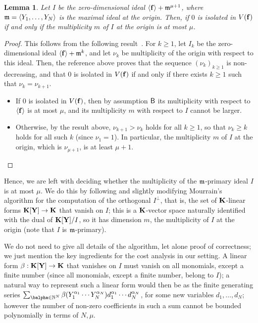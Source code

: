 \documentclass[12pt]{article}
\newtheorem{lemma}[definition]{Lemma}
\begin{document}
\begin{lemma}
  Let $I$ be the zero-dimensional ideal $\langle \mathbf{f} \rangle +
  \mathfrak{m}^{\mu+1}$, where $\mathfrak{m}=\langle Y_1,\dots,Y_N\rangle$ is the maximal
  ideal at the origin. Then, if $0$ is isolated in $V(\mathbf{f})$ if and only
  if the multiplicity $m$ of $I$ at the origin is at most $\mu$.
\end{lemma}
\begin{proof}
  This follows from the following
  result~\cite[Theorem~A.1]{BaHaPeSo09}.  For $k \ge 1$, let $I_k$ be
  the zero-dimensional ideal $\langle \mathbf{f} \rangle + \mathfrak{m}^{k}$, and let
  $\nu_k$ be multiplicity of the origin with respect to this
  ideal. Then, the reference above proves that the sequence
  $(\nu_k)_{k \ge 1}$ is non-decreasing, and that $0$ is isolated in
  $V(\mathbf{f})$ if and only if there exists $k\ge 1$ such that
  $\nu_k=\nu_{k+1}$.
  \begin{itemize}
  \item If $0$ is isolated in $V(\mathbf{f})$, then by assumption $\sf B$ 
    its multiplicity with respect to $\langle \mathbf{f}\rangle$ is at most $\mu$,
    and its multiplicity $m$ with respect to $I$ cannot be larger.
  \item Otherwise, by the result above, $\nu_{k+1} > \nu_k$ holds for
    all $k \ge 1$, so that $\nu_k \ge k$ holds for all such $k$ (since
    $\nu_1=1$). In particular, the multiplicity $m$ of 
 $I$ at the origin, which is $\nu_{\mu+1}$, is at least $\mu+1$.
    \qedhere
  \end{itemize}
\end{proof}

Hence, we are left with deciding whether the multiplicity of the
$\mathfrak{m}$-primary ideal $I$ is at most $\mu$. We do this by following and
slightly modifying Mourrain's algorithm for the computation of the
orthogonal $I^{\perp}$, that is, the set of $\mathbf{K}$-linear forms
$\mathbf{K}[\mathbf{Y}] \to \mathbf{K}$ that vanish on $I$; this is a $\mathbf{K}$-vector space
naturally identified with the dual of $\mathbf{K}[\mathbf{Y}]/I$, so it has dimension
$m$, the multiplicity of $I$ at the origin (note that $I$ is $\mathfrak{m}$-primary).

We do not need to give all details of the algorithm, let alone proof
of correctness; we just mention the key ingredients for the cost
analysis in our setting. A linear form $\beta: \mathbf{K}[\mathbf{Y}] \to \mathbf{K}$ that
vanishes on $I$ must vanish on all monomials, except a finite number
(since all monomials, except a finite number, belong to $I$); a
natural way to represent such a linear form would then be as the
finite generating series $\sum_{\balpha \in \N^N}
\beta(Y_1^{\alpha_1}\cdots Y_N^{\alpha_N}) d_1^{\alpha_1}\cdots
d_N^{\alpha_N}$, for some new variables $d_1,\dots,d_N$; however the
number of non-zero coefficients in such a sum cannot be bounded
polynomially in terms of $N,\mu$.
\end{document}

